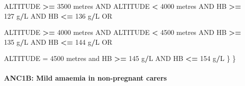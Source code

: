 \documentclass[12pt,a4paper]{article}
\newenvironment{Shaded}{\begin{snugshade}}{\end{snugshade}}
\newcommand{\DecValTok}[1]{\textcolor[rgb]{0.00,0.00,0.81}{#1}}
\newcommand{\NormalTok}[1]{#1}
\newcommand{\OperatorTok}[1]{\textcolor[rgb]{0.81,0.36,0.00}{\textbf{#1}}}
\newcommand{\StringTok}[1]{\textcolor[rgb]{0.31,0.60,0.02}{#1}}
\let\oldparagraph\paragraph
\renewcommand{\paragraph}[1]{\oldparagraph{#1}\mbox{}}
\begin{document}
\begin{Shaded}
\begin{Highlighting}[]
\NormalTok{        ALTITUDE }\OperatorTok{>=}\StringTok{ }\DecValTok{3500}\NormalTok{ metres AND ALTITUDE }\OperatorTok{<}\StringTok{ }\DecValTok{4000}\NormalTok{ metres AND }
\NormalTok{          HB }\OperatorTok{>=}\StringTok{ }\DecValTok{127}\NormalTok{ g}\OperatorTok{/}\NormalTok{L AND HB }\OperatorTok{<=}\StringTok{ }\DecValTok{136}\NormalTok{ g}\OperatorTok{/}\NormalTok{L OR}

\NormalTok{        ALTITUDE }\OperatorTok{>=}\StringTok{ }\DecValTok{4000}\NormalTok{ metres AND ALTITUDE }\OperatorTok{<}\StringTok{ }\DecValTok{4500}\NormalTok{ metres AND }
\NormalTok{          HB }\OperatorTok{>=}\StringTok{ }\DecValTok{135}\NormalTok{ g}\OperatorTok{/}\NormalTok{L AND HB }\OperatorTok{<=}\StringTok{ }\DecValTok{144}\NormalTok{ g}\OperatorTok{/}\NormalTok{L OR}

\NormalTok{        ALTITUDE =}\StringTok{ }\DecValTok{4500}\NormalTok{ metres and HB }\OperatorTok{>=}\StringTok{ }\DecValTok{145}\NormalTok{ g}\OperatorTok{/}\NormalTok{L AND HB }\OperatorTok{<=}\StringTok{ }\DecValTok{154}\NormalTok{ g}\OperatorTok{/}\NormalTok{L}
\NormalTok{      \}}
\NormalTok{  \}}
\end{Highlighting}
\end{Shaded}

\newpage

\hypertarget{anc1b-mild-amaemia-in-non-pregnant-carers}{%
\paragraph{ANC1B: Mild amaemia in non-pregnant carers}\label{anc1b-mild-amaemia-in-non-pregnant-carers}}
\end{document}
